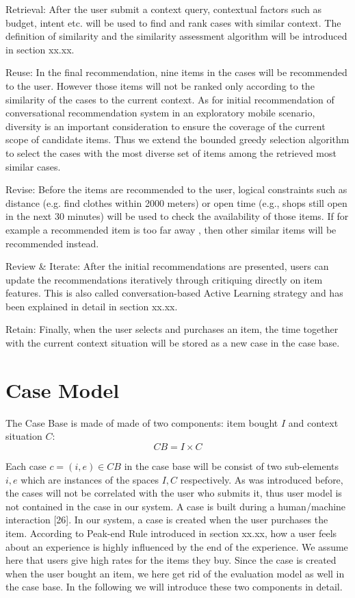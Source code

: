 Retrieval: After the user submit a context query, contextual factors such as budget, intent etc. will be used to find and rank cases with similar context. The definition of similarity and the similarity assessment algorithm will be introduced in section xx.xx. 

Reuse: In the final recommendation, nine items in the cases will be recommended to the user. However those items will not be ranked only according to the similarity of the cases to the current context. As for initial recommendation of conversational recommendation system in an exploratory mobile scenario, diversity is an important consideration to ensure the coverage of the current scope of candidate items. Thus we extend the bounded greedy selection algorithm to select the cases with the most diverse set of items among the retrieved most similar cases. 

Revise: Before the items are recommended to the user, logical constraints such as distance (e.g. find clothes within 2000 meters) or open time (e.g., shops still open in the next 30 minutes) will be used to check the availability of those items. If for example a recommended item is too far away , then other similar items will be recommended instead.

Review \& Iterate: After the initial recommendations are presented, users can update the recommendations iteratively through critiquing directly on item features. This is also called conversation-based Active Learning strategy and has been explained in detail in section xx.xx.

Retain: Finally, when the user selects and purchases an item, the time together with the current context situation will be stored as a new case in the case base.

\section{Case Model} \label{sec:cm}

The Case Base is made of made of two components: item bought $I$ and context situation $C$: 
\begin{equation} \label{eq:caseMode}
CB = I \times C
\end{equation}

Each case $c=(i,e) \in CB$ in the case base will be consist of two sub-elements $i,e$ which are instances of the spaces $I,C$ respectively. As was introduced before, the cases will not be correlated with the user who submits it, thus user model is not contained in the case in our system. A case is built during a human/machine interaction [26]. In our system, a case is created when the user purchases the item. According to Peak-end Rule introduced in section xx.xx, how a user feels about an experience is highly influenced by the end of the experience. We assume here that users give high rates for the items they buy.  Since the case is created when the user bought an item, we here get rid of the evaluation model as well in the case base. In the following we will introduce these two components in detail. 

